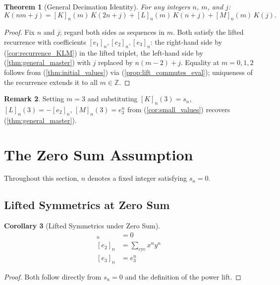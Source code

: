 \documentclass[12pt]{article}
\newtheorem{theorem}{Theorem}[section]
\newtheorem{corollary}[theorem]{Corollary}
\theoremstyle{definition}
\newtheorem{remark}[theorem]{Remark}
\newcommand{\cycsum}[1]{\sum_{\mathrm{cyc}}#1}
\newcommand{\lift}[2]{[#1]_{#2}}
\begin{document}
	\begin{theorem}[General Decimation Identity]
		\label{thm:general_decimation}
		For any integers $n$, $m$, and $j$:
		\[
		K(nm+j)
		= \lift{K}{n}(m)\,K(2n+j)
		+ \lift{L}{n}(m)\,K(n+j)
		+ \lift{M}{n}(m)\,K(j).
		\]
	\end{theorem}
	\begin{proof}
		Fix $n$ and $j$; regard both sides as sequences in $m$. Both satisfy the lifted recurrence with coefficients $\lift{e_1}{n}, \lift{e_2}{n}, \lift{e_3}{n}$: the right-hand side by (\ref{cor:recurrence_KLM}) in the lifted triplet, the left-hand side by (\ref{thm:general_master}) with $j$ replaced by $n(m-2)+j$. Equality at $m = 0, 1, 2$ follows from (\ref{thm:initial_values}) via (\ref{prop:lift_commutes_eval}); uniqueness of the recurrence extends it to all $m \in \mathbb{Z}$.
	\end{proof}
	
	\begin{remark}
		Setting $m = 3$ and substituting $\lift{K}{n}(3) = s_n$, $\lift{L}{n}(3) = -\lift{e_2}{n}$, $\lift{M}{n}(3) = e_3^n$ from (\ref{cor:small_values}) recovers (\ref{thm:general_master}).
	\end{remark}
	
	\section{The Zero Sum Assumption}
	\label{sec:sn_zero}
	
	Throughout this section, $n$ denotes a fixed integer satisfying $s_n = 0$.
	
	\subsection{Lifted Symmetrics at Zero Sum}
	\begin{corollary}[Lifted Symmetrics under Zero Sum]
		\label{cor:lifted_e1e2}
		\begin{align*}
			\lift{e_1}{n} &= 0\\
			\lift{e_2}{n} &= \cycsum{x^ny^n}\\
			\lift{e_3}{n} &= e_3^n
		\end{align*}
	\end{corollary}
	\begin{proof}
		Both follow directly from $s_n = 0$ and the definition of the power lift.
	\end{proof}
	
\end{document}
